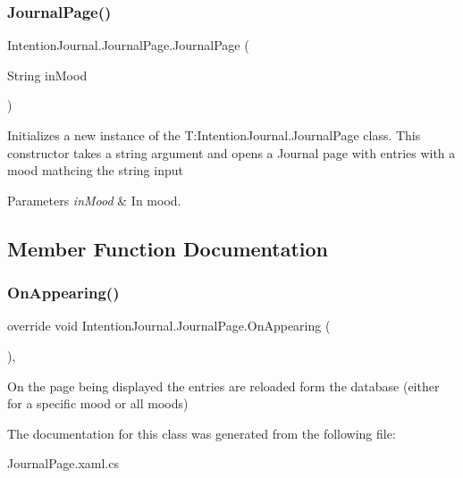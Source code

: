 \subsubsection{\texorpdfstring{Journal\+Page()}{JournalPage()}\hspace{0.1cm}{\footnotesize\ttfamily [2/2]}}
{\footnotesize\ttfamily Intention\+Journal.\+Journal\+Page.\+Journal\+Page (\begin{DoxyParamCaption}\item[{String}]{in\+Mood }\end{DoxyParamCaption})\hspace{0.3cm}{\ttfamily [inline]}}



Initializes a new instance of the T\+:\+Intention\+Journal.\+Journal\+Page class. This constructor takes a string argument and opens a Journal page with entries with a mood mathcing the string input 


\begin{DoxyParams}{Parameters}
{\em in\+Mood} & In mood.\\
\hline
\end{DoxyParams}


\subsection{Member Function Documentation}
\mbox{\label{class_intention_journal_1_1_journal_page_a6ad723713090dd3d7571c71ed53c5568}} 
\subsubsection{\texorpdfstring{On\+Appearing()}{OnAppearing()}}
{\footnotesize\ttfamily override void Intention\+Journal.\+Journal\+Page.\+On\+Appearing (\begin{DoxyParamCaption}{ }\end{DoxyParamCaption})\hspace{0.3cm}{\ttfamily [inline]}, {\ttfamily [protected]}}



On the page being displayed the entries are reloaded form the database (either for a specific mood or all moods) 



The documentation for this class was generated from the following file\+:\begin{DoxyCompactItemize}
\item 
Journal\+Page.\+xaml.\+cs\end{DoxyCompactItemize}
